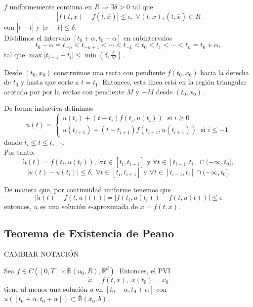 \begin{dem}
  $f$ uniformemente continua en $R \Rightarrow \exists \delta >0$ tal que
  \[ 
    | f(t, x) - f(\overline{t}, \overline{x}) | \leq \epsilon, \; \forall (t,x),(\overline{t},\overline{x}) \in R 
  \] 
  con $|  t - \overline{t} |$ y $| x - \overline{x} | \leq \delta$. \\

  Dividimos el intervalo $[t_{0} + \alpha, t_{0} - \alpha]$ en subintervalos
  \[ 
    t_{0} - \alpha = t_{-n} < t_{-n+1} < \cdots < t_{-1} < t_{0} < t_{1} < \cdots < t_{n} = t_{0} + \alpha,
  \] 
  tal que $\max | t_{i-1} - t_{i} | \leq \min(\delta, \frac{\delta}{M})$.

  Desde $(t_{0}, x_{0})$ construimos una recta con pendiente $f(t_{0}, x_{0})$ hacia la derecha de $t_{0}$ y hasta que corte a $t = t_{1}$. Entonces, esta linea está en la región triangular acotada por por la rectas con pendiente $M$ y $-M$ desde $(t_{0}, x_{0})$.

  De forma inductiva definimos
  \[ 
    u(t) =
    \begin{cases}
      u(t_{i}) + (t - t_{i})f(t_{i}, u(t_{i})) \; \text{ si } i \geq 0 \\
      u(t_{i+1}) + (t - t_{i+1})f(t_{i+1}, u(t_{i+1})) \; \text{ si } i \leq -1
    \end{cases} 
  \] 
  donde $t_{i} \leq t \leq t_{i+1}$.\\

  Por tanto,
  \[
    \dot{u}(t) = f(t_{i}, u(t_{i})), \;   \forall t \in [t_{i}, t_{i+1}] \text{ y }\forall t \in [t_{i-1}, t_{i}] \cap (-\infty, t_{0}],
  \]
  \[
    | u(t) - u(t_{i}) | \leq \delta,  \; \forall t \in [t_{i}, t_{i+1}] \text{ y } \forall t \in [t_{i-1}, t_{i}] \cap (-\infty, t_{0}]. 
  \]

  De manera que, por continuidad uniforme tenemos que
  \[ 
    | \dot{u}(t) - f(t, u(t)) | = | f(t_{i}, u(t_{i})) - f(t, u(t))| \leq \epsilon
  \] 
  entonces, $u$ es una solución $\epsilon$-aproximada de $\dot{x} = f(t, x)$.
\end{dem}

\subsection{Teorema de Existencia de Peano}

CAMBIAR NOTACIÓN

\begin{theo}[Peano]
  Sea $f \in C([0,T] \times \overline{\mathbb{B}}(u_{0},R), \mathbb{R}^{d})$. Entonces, el PVI 
  \[ 
    \dot{x} = f(t,x), \; x(t_{0}) = x_{0} 
  \] 
  tiene al menos una solución $u$ en $[t_{0} - \alpha, t_{0} + \alpha]$ con $u([t_{0} + \alpha, t_{0} +\alpha]) \subset \overline{\mathbb{B}}(x_{0}, b)$.
\end{theo}

